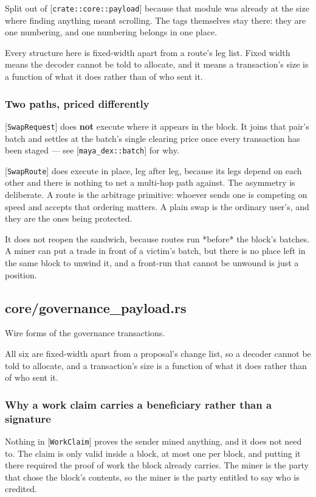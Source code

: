 \documentclass[11pt,a4paper]{article}
\begin{document}
Split out of [\texttt{crate::core::payload}] because that module was already at the
size where finding anything meant scrolling. The tags themselves stay there:
they are one numbering, and one numbering belongs in one place.

Every structure here is fixed-width apart from a route's leg list. Fixed
width means the decoder cannot be told to allocate, and it means a
transaction's size is a function of what it does rather than of who sent it.

\subsubsection{Two paths, priced differently}

[\texttt{SwapRequest}] does \textbf{not} execute where it appears in the block. It joins
that pair's batch and settles at the batch's single clearing price once
every transaction has been staged — see [\texttt{maya\_dex::batch}] for why.

[\texttt{SwapRoute}] does execute in place, leg after leg, because its legs depend
on each other and there is nothing to net a multi-hop path against. The
asymmetry is deliberate. A route is the arbitrage primitive: whoever sends
one is competing on speed and accepts that ordering matters. A plain swap is
the ordinary user's, and they are the ones being protected.

It does not reopen the sandwich, because routes run *before* the block's
batches. A miner can put a trade in front of a victim's batch, but there is
no place left in the same block to unwind it, and a front-run that cannot be
unwound is just a position.

\subsection{core/governance\_payload.rs}
Wire forms of the governance transactions.

All six are fixed-width apart from a proposal's change list, so a decoder
cannot be told to allocate, and a transaction's size is a function of what
it does rather than of who sent it.

\subsubsection{Why a work claim carries a beneficiary rather than a signature}

Nothing in [\texttt{WorkClaim}] proves the sender mined anything, and it does not
need to. The claim is only valid inside a block, at most one per block, and
putting it there required the proof of work the block already carries. The
miner is the party that chose the block's contents, so the miner is the
party entitled to say who is credited.
\end{document}
